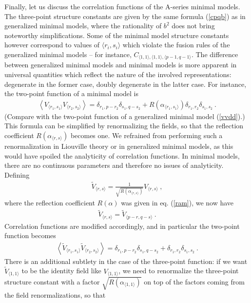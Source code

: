 \documentclass[12pt,a4paper,notitlepage]{report}
\newcommand \la {\left\langle}
\newcommand \ra {\right\rangle}
\numberwithin{equation}{section}
\theoremstyle{break}
\begin{document}
Finally, let us discuss the correlation functions of the A-series minimal models. The three-point structure constants are given by the same formula (\ref{cpqb}) as in generalized minimal models, where the rationality of $b^2$ does not bring noteworthy simplifications. 
Some of the minimal model structure constants however correspond to values of $\langle r_i,s_i\rangle$ which violate the fusion rules of the generalized minimal models -- for instance, $C_{\langle 1,1\rangle,\langle 1,1\rangle,\langle p-1,q-1\rangle}$. 
The difference between generalized minimal models and minimal models is more apparent in universal quantities which reflect the nature of the involved representations: degenerate in the former case, doubly degenerate in the latter case. For instance, the two-point function of a minimal model is 
\begin{align}
 \la V_{\langle r_1,s_1 \rangle} V_{\langle r_2,s_2 \rangle} \ra = \delta_{r_1,p-r_2}\delta_{s_1,q-s_2} + R(\alpha_{\langle r_1,s_1 \rangle}) \delta_{r_1,r_2} \delta_{s_1,s_2} \ .
\label{vvddp}
\end{align}
(Compare with the two-point function of a generalized minimal model (\ref{vvdd}).) This formula can be simplified by renormalizing the fields, so that the reflection coefficient $R(\alpha_{\langle r,s\rangle})$ becomes one. We refrained from performing such a renormalization in Liouville theory or in generalized minimal models, as this would have spoiled the analyticity of correlation functions. In minimal models, there are no continuous parameters and therefore no issues of analyticity. Defining
\begin{align}
 \boxed{\tilde{V}_{\langle r,s \rangle} = \frac{1}{\sqrt{R(\alpha_{\langle r,s \rangle})}} V_{\langle r,s \rangle}}\ , 
\end{align}
where the reflection coefficient $R(\alpha)$ was given in eq. (\ref{ram}), we now have 
\begin{align}
 \tilde{V}_{\langle r,s \rangle} = \tilde{V}_{\langle p-r,q-s \rangle}\ .
\end{align}
Correlation functions are modified accordingly, and in particular the two-point function becomes
\begin{align}
 \boxed{\la \tilde{V}_{\langle r_1,s_1 \rangle} \tilde{V}_{\langle r_2,s_2 \rangle} \ra = \delta_{r_1,p-r_2}\delta_{s_1,q-s_2} + \delta_{r_1,r_2} \delta_{s_1,s_2}} \ .
\end{align}
There is an additional subtlety in the case of the three-point function: if we want $\tilde{V}_{\langle 1,1 \rangle}$ to be the identity field like $V_{\langle 1,1 \rangle}$, we need to renormalize the three-point structure constant with a factor $\sqrt{R(\alpha_{\langle 1,1 \rangle})}$ on top of the factors coming from the field renormalizations, so that 
\end{document}
